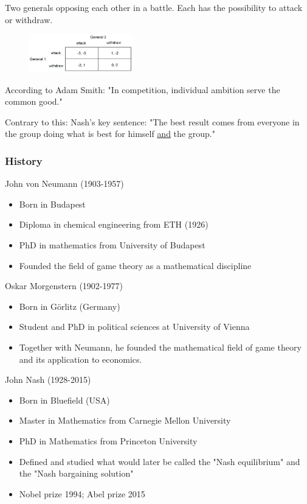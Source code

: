 Two generals opposing each other in a battle. Each has the possibility to
attack or withdraw.

\begin{figure}[h]
    \centering
    \includegraphics[width=0.4\textwidth]{Pictures/two_generals_GT.png}
\end{figure}

According to Adam Smith: "In competition, individual ambition serve the common
good."

Contrary to this: Nash's key sentence: "The best result comes from everyone in
the group doing what is best for himself \underline{and} the group."

\subsubsection{History}
John von Neumann (1903-1957)
\begin{itemize}
    \item Born in Budapest
    \item Diploma in chemical engineering from ETH (1926)
    \item PhD in mathematics from University of Budapest
    \item Founded the field of game theory as a mathematical discipline
\end{itemize}

Oskar Morgenstern (1902-1977)
\begin{itemize}
    \item Born in Görlitz (Germany)
    \item Student and PhD in political sciences at University of Vienna
    \item Together with Neumann, he founded the mathematical field of game
        theory and its application to economics.
\end{itemize}

John Nash (1928-2015)
\begin{itemize}
    \item Born in Bluefield (USA)
    \item Master in Mathematics from Carnegie Mellon University
    \item PhD in Mathematics from Princeton University
    \item Defined and studied what would later be called the "Nash equilibrium"
        and the "Nash bargaining solution"
    \item Nobel prize 1994; Abel prize 2015
\end{itemize}


